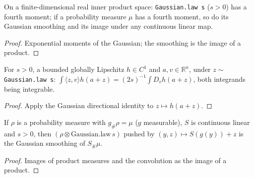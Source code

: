 \begin{lemma}
  \label{lem:gaussian-fourth-moments}
  \leanok
  On a finite-dimensional real inner product space: \texttt{Gaussian.law s} ($s>0$) has a fourth moment; if a probability
  measure $\mu$ has a fourth moment, so do its Gaussian smoothing and its image under any continuous linear map.
\end{lemma}
\begin{proof}
  \leanok
  Exponential moments of the Gaussian; the smoothing is the image of a product.
\end{proof}

\begin{lemma}
  \label{lem:gaussian-translated-directional-identity}
  \leanok
  For $s>0$, a bounded globally Lipschitz $h\in C^1$ and $a,v\in\mathbb R^n$, under $z\sim$ \texttt{Gaussian.law s}:
  $\int\langle z,v\rangle h(a+z)=(2s)^{-1}\int D_vh(a+z)$, both integrands being integrable.
\end{lemma}
\begin{proof}
  \leanok
  Apply the Gaussian directional identity to $z\mapsto h(a+z)$.
\end{proof}

\begin{lemma}
  \label{lem:gaussian-product-latent-map}
  \leanok
  If $\rho$ is a probability measure with $g_\#\rho=\mu$ ($g$ measurable), $S$ is continuous linear and $s>0$, then
  $(\rho\otimes\mathrm{Gaussian.law}\,s)$ pushed by $(y,z)\mapsto S(g(y))+z$ is the Gaussian smoothing of $S_\#\mu$.
\end{lemma}
\begin{proof}
  \leanok
  Images of product measures and the convolution as the image of a product.
\end{proof}

